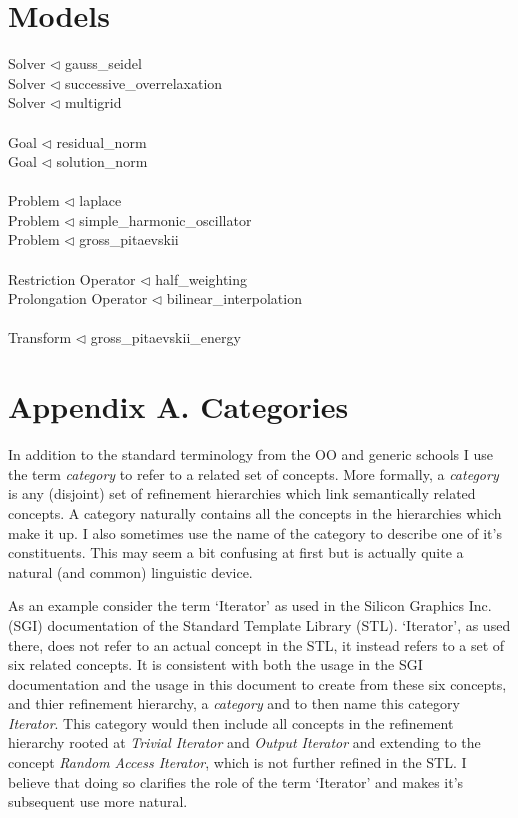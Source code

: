 \documentclass{article}
\begin{document}
\section{Models}
Solver $\triangleleft$  gauss\_seidel \\
Solver $\triangleleft$  successive\_overrelaxation \\
Solver $\triangleleft$  multigrid \\
\\
Goal $\triangleleft$  residual\_norm \\
Goal $\triangleleft$  solution\_norm \\
\\
Problem $\triangleleft$  laplace \\
Problem $\triangleleft$  simple\_harmonic\_oscillator \\
Problem $\triangleleft$  gross\_pitaevskii \\
\\
Restriction Operator $\triangleleft$  half\_weighting \\
Prolongation Operator $\triangleleft$  bilinear\_interpolation \\
\\
Transform $\triangleleft$ gross\_pitaevskii\_energy\\

\section{Appendix A. Categories}
In addition to the standard terminology from the OO and generic schools I use the term
\emph{category} to refer to a related set of concepts. More formally, a \emph{category}
is any (disjoint) set of refinement hierarchies which link
semantically related concepts. A category naturally contains all the concepts in the hierarchies which
make it up.
I also sometimes use the name of the category to describe one of it's constituents. This may seem a bit
confusing at first but is actually quite a natural (and common) linguistic device.


As an example consider the term `Iterator' as used in the Silicon Graphics Inc.
(SGI) documentation of the Standard Template Library (STL). `Iterator', as used there, does
not refer to an actual concept in the STL, it instead refers to a set of six related concepts.
It is consistent with both the usage in the SGI documentation and the usage in this document to create
from these six concepts, and thier refinement hierarchy, a \emph{category} and to then name this category
\emph{Iterator}. This category would then include all concepts in 
the refinement hierarchy rooted at \emph{Trivial Iterator} and \emph{Output Iterator} and extending to
the concept \emph{Random Access Iterator}, which is not further refined in the STL. I believe that doing
so clarifies the role of the term `Iterator' and makes it's subsequent use more natural.
\end{document}
